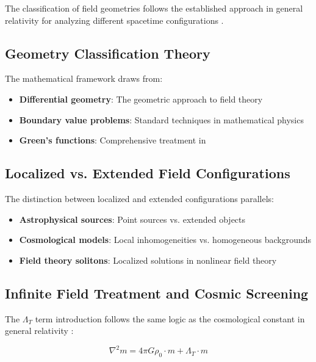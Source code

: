 \documentclass[12pt,a4paper]{article}
\begin{document}
	The classification of field geometries follows the established approach in general relativity for analyzing different spacetime configurations \citep{hawking1973,wald1984}.
	
	\subsection{Geometry Classification Theory}
	\label{subsec:geometry_theory}
	
	The mathematical framework draws from:
	\begin{itemize}
		\item \textbf{Differential geometry}: The geometric approach to field theory \citep{misner1973,abraham1988}
		\item \textbf{Boundary value problems}: Standard techniques in mathematical physics \citep{stakgold1998,haberman2004}
		\item \textbf{Green's functions}: Comprehensive treatment in \citep{duffy2001,roach1982}
	\end{itemize}
	
	\subsection{Localized vs. Extended Field Configurations}
	\label{subsec:localized_extended}
	
	The distinction between localized and extended configurations parallels:
	\begin{itemize}
		\item \textbf{Astrophysical sources}: Point sources vs. extended objects \citep{binney2008,carroll2006}
		\item \textbf{Cosmological models}: Local inhomogeneities vs. homogeneous backgrounds \citep{weinberg2008,peebles1993}
		\item \textbf{Field theory solitons}: Localized solutions in nonlinear field theory \citep{rajaraman1982}
	\end{itemize}
	
	\subsection{Infinite Field Treatment and Cosmic Screening}
	\label{subsec:infinite_field_treatment}
	
	The $\Lambda_T$ term introduction follows the same logic as the cosmological constant in general relativity \citep{einstein1917,weinberg1989}:
	
	\begin{equation}
		\nabla^2 m = 4\pi G \rho_0 \cdot m + \Lambda_T \cdot m
	\end{equation}
	
\end{document}
